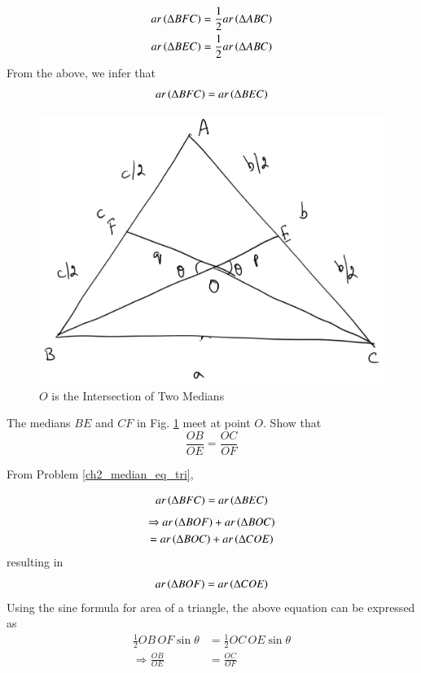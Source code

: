 \begin{align}
ar \left(\Delta BFC\right) &= \frac{1}{2} ar \left(\Delta ABC\right) \\
ar \left(\Delta BEC\right) &= \frac{1}{2} ar \left(\Delta ABC\right) 
\end{align}
From the above, we infer that
%
\begin{equation}
ar \left(\Delta BFC\right) = ar \left(\Delta BEC\right)
\end{equation}


\begin{figure}[!h]
	\begin{center}
		
		\includegraphics[width=\columnwidth]{./figs/ch2_median_ratio}
		\vspace*{-10cm}
	\end{center}
	\caption{$O$ is the Intersection of Two Medians}
	\label{ch2_median_ratio}	
\end{figure}
%
\begin{problem}
	The medians $BE$ and $CF$ in Fig. \ref{ch2_median_ratio} meet at point $O$.  Show that
	\begin{equation}
	\frac{OB}{OE} = \frac{OC}{OF} 
	\end{equation} 
\end{problem}
\proof From Problem \ref{ch2_median_eq_tri},

\begin{equation}
ar \left(\Delta BFC\right) = ar \left(\Delta BEC\right)
\end{equation}
%
\begin{multline}
\Rightarrow ar \left(\Delta BOF\right) + ar \left(\Delta BOC\right) \\
= ar \left(\Delta BOC\right) + ar \left(\Delta COE\right) 
\end{multline}
resulting in
%
\begin{equation}
ar \left(\Delta BOF\right) 
=  ar \left(\Delta COE\right) 
\end{equation}
%
Using the sine formula for area of a triangle, the above equation can be expressed as
%
\begin{align}
\frac{1}{2}OB\,OF \sin \theta &= \frac{1}{2}OC\,OE \sin \theta \\
\Rightarrow 	\frac{OB}{OE} &= \frac{OC}{OF} 
\end{align}

